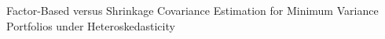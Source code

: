 \documentclass[]{article}
\begin{document}
Factor-Based versus Shrinkage Covariance Estimation for Minimum Variance Portfolios under Heteroskedasticity
\end{document}
